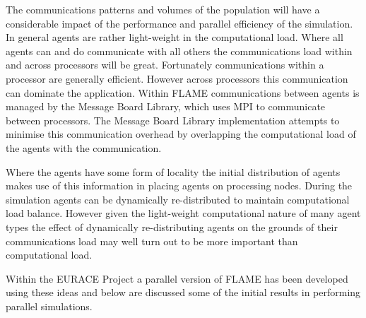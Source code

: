 The communications patterns and volumes of the population will have a considerable impact of the performance and parallel efficiency of the simulation. In general agents are rather light-weight in the computational load. Where all agents can and do communicate with all others the communications load within and across processors will be great. Fortunately communications within a processor are generally efficient. However across processors this communication can dominate the application. Within FLAME communications between agents is managed by the Message Board Library, which uses MPI to communicate between processors. The Message Board Library implementation attempts to minimise this communication overhead by overlapping the computational load of the agents with the communication. 

Where the agents have some form of locality the initial distribution of agents makes use of this information in placing agents on processing nodes. During the simulation agents can be dynamically re-distributed to maintain computational load balance. However given the light-weight computational nature of many agent types the effect of dynamically re-distributing agents on the grounds of their communications load may well turn out to be more important than computational load.

Within the EURACE Project a parallel version of FLAME has been developed using these ideas and below are discussed some of the initial results in performing parallel simulations.

